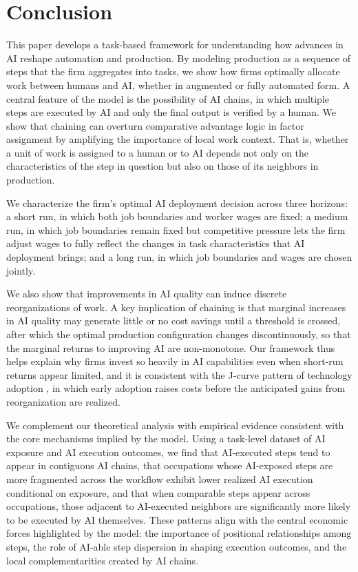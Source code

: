 \section{Conclusion}

This paper develops a task-based framework for understanding how advances in AI reshape automation and production.
By modeling production as a sequence of steps that the firm aggregates into tasks, we show how firms optimally allocate work between humans and AI, whether in augmented or fully automated form.
A central feature of the model is the possibility of AI chains, in which multiple steps are executed by AI and only the final output is verified by a human.
We show that chaining can overturn comparative advantage logic in factor assignment by amplifying the importance of local work context.
That is, whether a unit of work is assigned to a human or to AI depends not only on the characteristics of the step in question but also on those of its neighbors in production.

We characterize the firm's optimal AI deployment decision across three horizons: a short run, in which both job boundaries and worker wages are fixed; a medium run, in which job boundaries remain fixed but competitive pressure lets the firm adjust wages to fully reflect the changes in task characteristics that AI deployment brings; and a long run, in which job boundaries and wages are chosen jointly.

We also show that improvements in AI quality can induce discrete reorganizations of work.
A key implication of chaining is that marginal increases in AI quality may generate little or no cost savings until a threshold is crossed, after which the optimal production configuration changes discontinuously, so that the marginal returns to improving AI are non-monotone.
Our framework thus helps explain why firms invest so heavily in AI capabilities even when short-run returns appear limited, and it is consistent with the J-curve pattern of technology adoption \citep{brynjolfsson2021productivity}, in which early adoption raises costs before the anticipated gains from reorganization are realized.

We complement our theoretical analysis with empirical evidence consistent with the core mechanisms implied by the model.
Using a task-level dataset of AI exposure and AI execution outcomes, we find that AI-executed steps tend to appear in contiguous AI chains, that occupations whose AI-exposed steps are more fragmented across the workflow exhibit lower realized AI execution conditional on exposure, and that when comparable steps appear across occupations, those adjacent to AI-executed neighbors are significantly more likely to be executed by AI themselves.
These patterns align with the central economic forces highlighted by the model: the importance of positional relationships among steps, the role of AI-able step dispersion in shaping execution outcomes, and the local complementarities created by AI chains.
